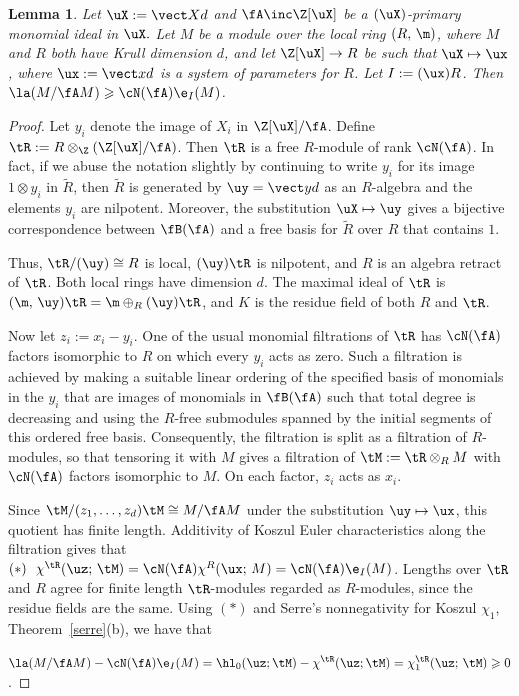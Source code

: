 \documentclass[12pt]{amsart}
\theoremstyle{plain}
\newtheorem{lemma}[theorem]{Lemma}
\theoremstyle{remark}
\theoremstyle{definition}
\numberwithin{equation}{theorem}
\renewcommand{\geq}{\geqslant} \renewcommand{\leq}{\leqslant}
\begin{document}
\begin{lemma}\label{pre-main} Let $\uX :=\vect X d$ and $\fA \inc \Z[\uX]$ be 
a $(\uX)$-primary monomial ideal in $\uX.$ Let $M$ be a \fg module
over the local ring $(R,\,\m)$, where $M$ and $R$ both have Krull dimension $d$, 
and let  $\Z[\uX] \to R$ be such that $\uX \mapsto \ux$, where $\ux := \vect xd$
is a system of parameters for $R$. Let $I:=(\ux)R$. 
Then $\la(M/\fA M)\geq \cN(\fA)\e_I(M)$.                 
\end{lemma}
\begin{proof} Let $y_i$ denote the image of $X_i$ in $\Z[\uX]/\fA$. Define 
$\tR := R \otimes_{\Z}(\Z[\uX]/\fA)$.  Then $\tR$ is a free $R$-module of rank
$\cN(\fA)$. In fact, if we abuse the notation slightly by continuing to write $y_i$ for its image $1\otimes y_i$ in $\tilde R$, then $\tilde R$ is generated by $\uy = \vect y d$ as an $R$-algebra and the elements $y_i$ are nilpotent. Moreover, the substitution $\uX \mapsto \uy$ gives a bijective correspondence between $\fB(\fA)$ and a free basis for $\tilde R$ over $R$ that contains $1$.

Thus, $\tR/(\uy) \cong R$ is local, $(\uy)\tR$ is nilpotent,  and $R$ is an 
algebra retract of $\tR$. Both local rings have dimension $d$.  The maximal ideal 
of $\tR$ is $(\m,\, \uy)\tR = \m \oplus_R (\uy)\tR$, and $K$ is the residue field of both
$R$ and $\tR$.

Now let $z_i:=x_i-y_i$.  One of the usual 
monomial filtrations of $\tR$ has $\cN(\fA)$ factors isomorphic 
to $R$ on which every $y_i$ acts as zero. Such a filtration is achieved by making 
a suitable linear ordering of the specified basis of monomials in the $y_i$ that are images
of monomials in $\fB(\fA)$ such that total degree is decreasing and 
using the $R$-free submodules spanned by the initial segments of this ordered free basis.
Consequently, the filtration is 
split as a filtration of $R$-modules, so that tensoring it with $M$ 
gives a filtration of $\tM:= \tR \otimes_R M$ with $\cN(\fA)$ factors 
isomorphic to $M$.  On each factor, $z_i$ acts as $x_i$.

Since $\tM/(z_1,\ldots,z_{d})\tM \cong M/\fA M$
under the substitution $\uy \mapsto \ux$, this quotient has finite length.  
Additivity of Koszul Euler characteristics along the filtration gives that 
$(*) \ \ \chi^{\tR}(\uz;\,\tM) = \cN(\fA)\chi^R(\ux;\,M)= \cN(\fA)\e_I(M)$.
Lengths over $\tR$ and $R$ agree for  finite length $\tR$-modules regarded 
as $R$-modules, since the residue fields are the same. Using $(*)$  
and Serre's nonnegativity for Koszul $\chi_1$, Theorem~\ref{serre}(b), we have that\newline


$ \displaystyle
 \la(M/\fA M)-\cN(\fA)\e_I(M)
 = \hl_0(\uz; \tM)-\chi^{\tR}(\uz;\tM)  =\chi^{\tR}_1(\uz;\,\tM)\geq 0
$.
\end{proof}
\end{document}
